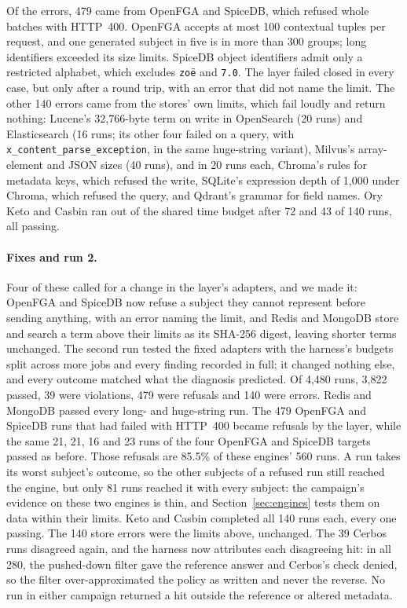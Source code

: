 Of the errors, 479 came from OpenFGA and SpiceDB, which refused whole batches with HTTP~400. OpenFGA
accepts at most 100 contextual tuples per request, and one generated subject in five is in more than
300 groups; long identifiers exceeded its size limits. SpiceDB object identifiers admit only a
restricted alphabet, which excludes \texttt{zo\"e} and \texttt{7.0}. The layer failed closed in every
case, but only after a round trip, with an error that did not name the limit. The other 140 errors
came from the stores' own limits, which fail loudly and return nothing: Lucene's 32,766-byte term on
write in OpenSearch (20 runs) and Elasticsearch (16 runs; its other four failed on a query, with
\texttt{x\_content\_parse\_exception}, in the same huge-string variant), Milvus's array-element and JSON
sizes (40 runs), and in 20 runs each, Chroma's rules for metadata keys, which refused the write,
SQLite's expression depth of 1,000 under Chroma, which refused the query, and Qdrant's grammar for
field names. Ory Keto and Casbin ran out of the shared time budget after 72 and 43 of 140 runs, all
passing.

\paragraph{Fixes and run 2.}
Four of these called for a change in the layer's adapters, and we made it: OpenFGA and SpiceDB now refuse
a subject they cannot represent before sending anything, with an error naming the limit, and Redis
and MongoDB store and search a term above their limits as its SHA-256 digest, leaving shorter terms
unchanged. The second run tested the fixed adapters with the harness's budgets split across more
jobs and every finding recorded in full; it changed nothing else, and every outcome matched what the
diagnosis predicted. Of 4,480 runs, 3,822 passed, 39 were violations, 479 were refusals and 140
were errors. Redis and MongoDB passed every long- and huge-string run. The 479 OpenFGA and SpiceDB
runs that had failed with HTTP~400 became refusals by the layer, while the same 21, 21, 16 and 23
runs of the four OpenFGA and SpiceDB targets passed as before. Those refusals are 85.5\% of these
engines' 560 runs. A run takes its worst subject's outcome, so the other subjects of a refused run
still reached the engine, but only 81 runs reached it with every subject: the campaign's evidence on
these two engines is thin, and Section~\ref{sec:engines} tests them on data within their limits.
Keto and Casbin completed all 140 runs each, every one
passing. The 140 store errors were the limits above, unchanged. The 39 Cerbos runs
disagreed again, and the harness now attributes each disagreeing hit: in all 280, the pushed-down
filter gave the reference answer and Cerbos's check denied, so the filter over-approximated the
policy as written and never the reverse. No run in either campaign returned a hit outside the
reference or altered metadata.


